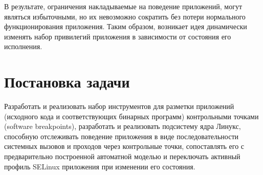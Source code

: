 В результате, ограничения накладываемые на поведение приложений,
могут являться избыточными, но их невозможно сократить без потери
нормального функционирования приложения. Таким образом, возникает
идея динамически изменять набор привилегий приложения в зависимости
от состояния его исполнения.
 
\newpage
\section{Постановка задачи}
\begin{comment}
\subsection{Расшифровка темы}
Завершение работ 3 курса и работ Торощина,
Сапожникова, Горнак по отслеживанию поведения приложений со стороны ядра
ОС с помощью расстановки отладочных меток, сопоставления наблюдаемых
трасс с предварительно построенной моделью поведения и переключению
текущего профиля SELinux при изменениях состояния приложения.
Демонстрация reference implementation на примере популярного приложения
с искуственно внесённой уязвимостью. Публикация проекта.
\end{comment}

Разработать и реализовать набор инструментов для
разметки приложений (исходного кода и соответствующих бинарных программ)
контрольными точками (software breakpoints), разработать и реализовать
подсистему ядра Линукс, способную отслеживать поведение приложения в
виде последовательности системных вызовов и проходов через контрольные
точки, сопоставлять его с предварительно построенной автоматной моделью
и переключать активный профиль SELinux приложения при изменении его
состояния.

